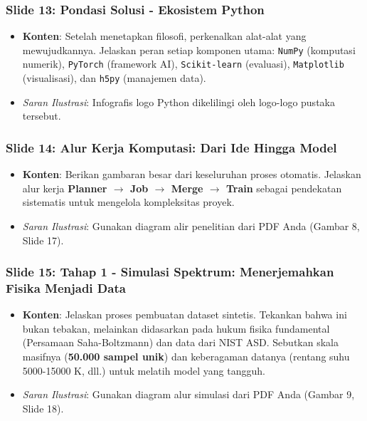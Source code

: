\documentclass[12pt, a4paper]{article}
\begin{document}
\subsubsection*{Slide 13: Pondasi Solusi - Ekosistem Python}
\begin{itemize}
    \item \textbf{Konten}: Setelah menetapkan filosofi, perkenalkan alat-alat yang mewujudkannya. Jelaskan peran setiap komponen utama: \texttt{NumPy} (komputasi numerik), \texttt{PyTorch} (framework AI), \texttt{Scikit-learn} (evaluasi), \texttt{Matplotlib} (visualisasi), dan \texttt{h5py} (manajemen data).
    \item \textit{Saran Ilustrasi}: Infografis logo Python dikelilingi oleh logo-logo pustaka tersebut.
\end{itemize}

\subsubsection*{Slide 14: Alur Kerja Komputasi: Dari Ide Hingga Model}
\begin{itemize}
    \item \textbf{Konten}: Berikan gambaran besar dari keseluruhan proses otomatis. Jelaskan alur kerja \textbf{Planner $\rightarrow$ Job $\rightarrow$ Merge $\rightarrow$ Train} sebagai pendekatan sistematis untuk mengelola kompleksitas proyek.
    \item \textit{Saran Ilustrasi}: Gunakan diagram alir penelitian dari PDF Anda (Gambar 8, Slide 17).
\end{itemize}

\subsubsection*{Slide 15: Tahap 1 - Simulasi Spektrum: Menerjemahkan Fisika Menjadi Data}
\begin{itemize}
    \item \textbf{Konten}: Jelaskan proses pembuatan dataset sintetis. Tekankan bahwa ini bukan tebakan, melainkan didasarkan pada hukum fisika fundamental (Persamaan Saha-Boltzmann) dan data dari NIST ASD. Sebutkan skala masifnya (\textbf{50.000 sampel unik}) dan keberagaman datanya (rentang suhu 5000-15000 K, dll.) untuk melatih model yang tangguh.
    \item \textit{Saran Ilustrasi}: Gunakan diagram alur simulasi dari PDF Anda (Gambar 9, Slide 18).
\end{itemize}
\end{document}
